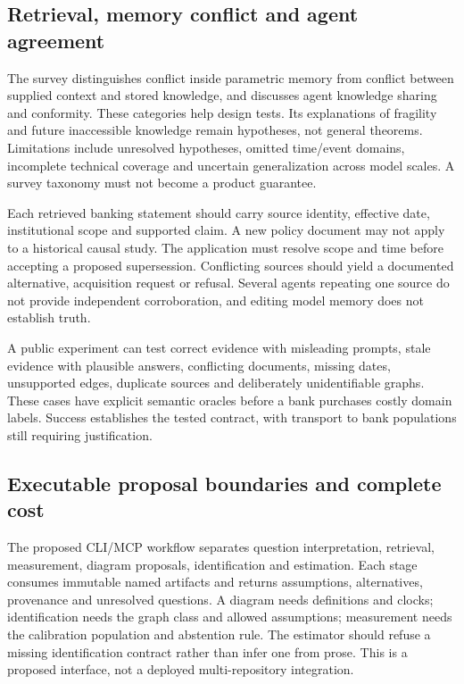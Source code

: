 \subsection{Retrieval, memory conflict and agent agreement}
The survey distinguishes conflict inside parametric memory from conflict between supplied context and stored knowledge, and discusses agent knowledge sharing and conformity. These categories help design tests. Its explanations of fragility and future inaccessible knowledge remain hypotheses, not general theorems. Limitations include unresolved hypotheses, omitted time/event domains, incomplete technical coverage and uncertain generalization across model scales. A survey taxonomy must not become a product guarantee.~\citep{exec24_knowledge_original}

Each retrieved banking statement should carry source identity, effective date, institutional scope and supported claim. A new policy document may not apply to a historical causal study. The application must resolve scope and time before accepting a proposed supersession. Conflicting sources should yield a documented alternative, acquisition request or refusal. Several agents repeating one source do not provide independent corroboration, and editing model memory does not establish truth.~\citep{exec24_css_knowledge_reference}

A public experiment can test correct evidence with misleading prompts, stale evidence with plausible answers, conflicting documents, missing dates, unsupported edges, duplicate sources and deliberately unidentifiable graphs. These cases have explicit semantic oracles before a bank purchases costly domain labels. Success establishes the tested contract, with transport to bank populations still requiring justification.~\citep{exec24_css_knowledge_reference}

\subsection{Executable proposal boundaries and complete cost}
The proposed CLI/MCP workflow separates question interpretation, retrieval, measurement, diagram proposals, identification and estimation. Each stage consumes immutable named artifacts and returns assumptions, alternatives, provenance and unresolved questions. A diagram needs definitions and clocks; identification needs the graph class and allowed assumptions; measurement needs the calibration population and abstention rule. The estimator should refuse a missing identification contract rather than infer one from prose. This is a proposed interface, not a deployed multi-repository integration.~\citep{exec24_css_knowledge_reference}

